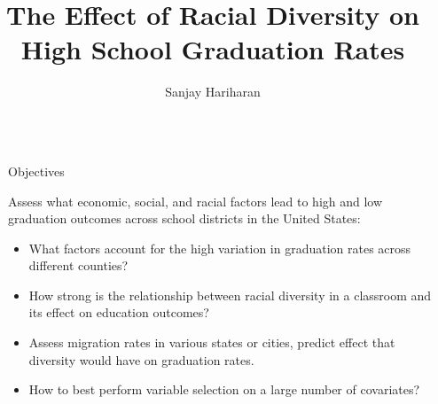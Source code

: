\documentclass[final]{beamer}
\title{The Effect of Racial Diversity on High School Graduation Rates} %
\author{Sanjay Hariharan} %
\institute{Department of Statistics, Duke University} %
\newlength{\sepwid}
\newlength{\onecolwid}
\begin{document}

\setlength{\belowcaptionskip}{2ex} %
\setlength\belowdisplayshortskip{2ex} %

\begin{frame}[t] %

\begin{columns}[t] %

\begin{column}{\sepwid}\end{column} %

\begin{column}{\onecolwid} %


\begin{alertblock}{Objectives}

Assess what economic, social, and racial factors lead to high and low graduation outcomes across school districts in the United States:
\begin{itemize}
\item What factors account for the high variation in graduation rates across different counties?
\item How strong is the relationship between racial diversity in a classroom and its effect on education outcomes?
\item Assess migration rates in various states or cities, predict effect that diversity would have on graduation rates.
\item How to best perform variable selection on a large number of covariates?
\end{itemize}

\end{alertblock}



\end{column}
\end{columns}
\end{frame}
\end{document}
